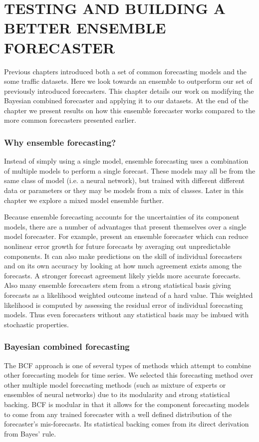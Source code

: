 \chapter{TESTING AND BUILDING A BETTER ENSEMBLE FORECASTER}
\label{ch:BCF}
Previous chapters introduced both a set of common forecasting models and the some traffic datasets.  Here we look towards an ensemble to outperform our set of previously introduced forecasters.  This chapter details our work on modifying the Bayesian combined forecaster and applying it to our datasets.  At the end of the chapter we present results on how this ensemble forecaster works compared to the more common forecasters presented earlier.  

\subsection{Why ensemble forecasting?}
Instead of simply using a single model, ensemble forecasting uses a combination of multiple models to perform a single forecast.  These models may all be from the same class of model (i.e. a neural network), but trained with different different data or parameters or they may be models from a mix of classes.  Later in this chapter we explore a mixed model ensemble further.

Because ensemble forecasting accounts for the uncertainties of its component models, there are a number of advantages that present themselves over a single model forecaster.  For example, \cite{Tracton1993, Zhang2010} present an ensemble forecaster which can reduce nonlinear error growth for future forecasts by averaging out unpredictable components.  It can also make predictions on the skill of individual forecasters and on its own accuracy by looking at how much agreement exists among the forecasts.  A stronger forecast agreement likely yields more accurate forecasts.  Also many ensemble forecasters stem from a strong statistical basis giving forecasts as a likelihood weighted outcome instead of a hard value.  This weighted likelihood is computed by assessing the residual error of individual forecasting models.  Thus even forecasters without any statistical basis may be imbued with stochastic properties.


\subsection{Bayesian combined forecasting}
The BCF approach \cite{Petridis2001} is one of several types of methods which attempt to combine other forecasting models for time series. We selected this forecasting method over other multiple model forecasting methods (such as mixture of experts or ensembles of neural networks) due to its modularity and strong statistical backing.  BCF is modular in that it allows for the component forecasting models to come from any trained forecaster with a well defined distribution of the forecaster's mis-forecasts.  Its statistical backing comes from its direct derivation from Bayes' rule.

